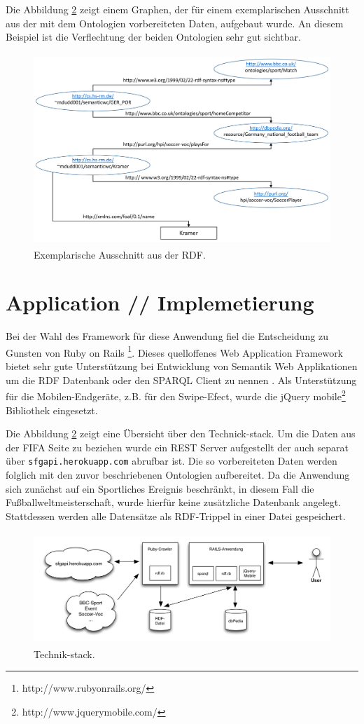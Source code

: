 \documentclass[runningheads,a4paper]{llncs}
\begin{document}
Die Abbildung \ref{fig:example} zeigt einem Graphen, der für einem exemplarischen Ausschnitt aus der mit dem Ontologien vorbereiteten Daten, aufgebaut wurde. An diesem Beispiel ist die Verflechtung der beiden Ontologien sehr gut sichtbar.

\begin{figure}
\centering
\includegraphics[height=7.2cm]{graph_manus}
\caption{Exemplarische Ausschnitt aus der RDF.}
\label{fig:example}
\end{figure}

\newpage
\section{Application // Implemetierung}


Bei der Wahl des Framework für diese Anwendung fiel die Entscheidung zu Gunsten von Ruby on Rails \footnote{http://www.rubyonrails.org/}. Dieses quelloffenes Web Application Framework bietet sehr gute Unterstützung bei Entwicklung von Semantik Web Applikationen um die RDF Datenbank oder den SPARQL Client zu nennen . Als Unterstützung für die Mobilen-Endgeräte, z.B. für den Swipe-Efect,  wurde die jQuery mobile\footnote{http://www.jquerymobile.com/} Bibliothek eingesetzt. 

Die Abbildung \ref{fig:example} zeigt eine Übersicht über den Technick-stack. Um die Daten aus der FIFA Seite zu beziehen wurde ein REST Server aufgestellt der auch separat über \texttt{sfgapi.herokuapp.com} abrufbar ist. Die so vorbereiteten Daten werden folglich mit den zuvor beschriebenen Ontologien aufbereitet. Da die Anwendung sich zunächst auf ein Sportliches Ereignis beschränkt, in diesem Fall die Fußballweltmeisterschaft, wurde hierfür keine zusätzliche Datenbank angelegt. Stattdessen werden alle Datensätze als RDF-Trippel in einer Datei gespeichert.
\begin{figure}
\centering
\includegraphics[height=4.2cm]{technik-stack}
\caption{Technik-stack.}
\label{fig:example}
\end{figure}
\end{document}
